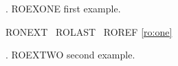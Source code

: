 

\ex.\label{ro:one} ROEXONE first example.

RONEXT \Next\ ROLAST \Last\ ROREF \ref{ro:one}

\ex. ROEXTWO second example.

